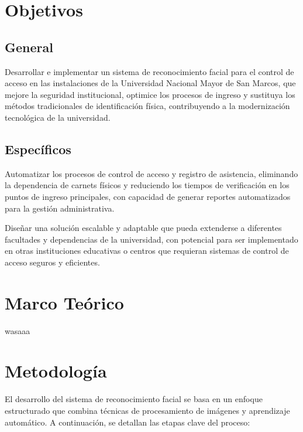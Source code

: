 \documentclass[12pt]{article}
\begin{document}
{%
\section{Objetivos}
\subsection{General}
Desarrollar e implementar un sistema de reconocimiento facial para el control de acceso en las instalaciones de la Universidad Nacional Mayor de San Marcos, que mejore la seguridad institucional, optimice los procesos de ingreso y sustituya los métodos tradicionales de identificación física, contribuyendo a la modernización tecnológica de la universidad.
\subsection{Específicos}
Automatizar los procesos de control de acceso y registro de asistencia, eliminando la dependencia de carnets físicos y reduciendo los tiempos de verificación en los puntos de ingreso principales, con capacidad de generar reportes automatizados para la gestión administrativa.

Diseñar una solución escalable y adaptable que pueda extenderse a diferentes facultades y dependencias de la universidad, con potencial para ser implementado en otras instituciones educativas o centros que requieran sistemas de control de acceso seguros y eficientes.


\section{Marco Teórico}
wasaaa


\section{Metodología}
El desarrollo del sistema de reconocimiento facial se basa en un enfoque estructurado que combina técnicas de procesamiento de imágenes y aprendizaje automático. A continuación, se detallan las etapas clave del proceso:
}
\end{document}
